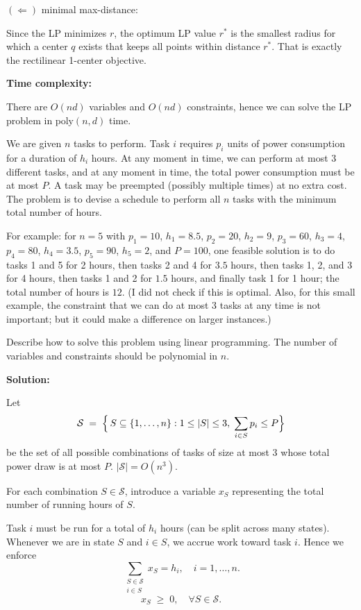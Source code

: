 \documentclass[11pt]{article}
\begin{document}
\begin{description}
\begin{enumerate}
  \((\Longleftarrow)\) minimal max-distance:

  Since the LP minimizes \(r\), the optimum LP value \(r^*\) is the smallest radius for which a center \(q\) exists that keeps all points within distance \(r^*\).  That is exactly the rectilinear 1-center objective.
  
  \textbf{Time complexity:}

  There are \(O(nd)\) variables and \(O(nd)\) constraints, 
  hence we can solve the LP problem in \(\mathrm{poly}(n,d)\) time.

\end{enumerate}



\newpage
\item[Problem 8.3:]
We are given $n$ tasks to perform.  Task $i$ requires
$p_i$ units of power consumption for a duration of $h_i$ hours.
At any moment in time, we can perform at most 3 different tasks, 
and at any moment in time, the total power consumption must be at most
$P$.  A task may be preempted (possibly multiple times) at
no extra cost.  The problem is to devise a schedule to
perform all $n$ tasks with the minimum total number of hours.

For example: for $n=5$ with $p_1=10$, $h_1=8.5$, $p_2=20$, $h_2=9$,
$p_3=60$, $h_3=4$, $p_4=80$, $h_4=3.5$, $p_5=90$, $h_5=2$, and $P=100$,
one feasible solution is to do tasks 1 and 5 for 2 hours,
then tasks 2 and 4 for $3.5$ hours,
then tasks 1, 2, and 3 for 4 hours,
then tasks 1 and 2 for $1.5$ hours,
and finally task 1 for 1 hour; the total number of hours is $12$.
(I did not check if this is optimal.  Also, for this small
example, the constraint that we can do at most 3 tasks at any time
is not important; but it could make a difference on larger instances.)

Describe how to solve this problem
using linear programming.
The number of variables and constraints should be polynomial in $n$.

\newpage
\textbf{Solution:}

Let  
\[
  \mathcal{S} \;=\;
  \Bigl\{\,S\subseteq\{1,\dots,n\}:
    1\le |S|\le3,\;\sum_{i\in S}p_i\le P
  \Bigr\}
\]
be the set of all possible combinations of tasks of size at most 3 whose total power draw is at most \(P\). \(|\mathcal{S}|=O(n^3)\).

For each combination \(S\in\mathcal{S}\), introduce a variable $x_S$ representing the total number of running hours of \(S\).

Task \(i\) must be run for a total of \(h_i\) hours (can be split across many states).  Whenever we are in state \(S\) and \(i\in S\), we accrue work toward task \(i\). Hence we enforce
\[
  \sum_{\substack{S\in\mathcal{S}\\i\in S}} x_S = 
  h_i, \quad i=1,\dots,n.
\]
\[
  x_S \;\ge\; 0,
  \quad
  \forall S\in\mathcal{S}.
\]


\end{description}
\end{document}
